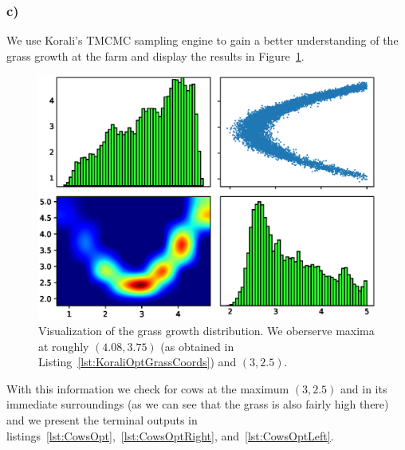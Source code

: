 \documentclass{article}
\begin{document}
    \subsubsection*{c)}
    \label{subsubsec:Task1c}

    We use Korali's TMCMC sampling engine to gain a better understanding of
    the grass growth at the farm and display the results in
    Figure~\ref{fig:GrassHeight}.

    \begin{figure}[H]
         \begin{center}
            \includegraphics[width=.75\textwidth]{task1/results/task1c.eps}
        \end{center}
        \caption{Visualization of the grass growth distribution.
        We oberserve maxima at roughly $\left( 4.08, 3 .75 \right)$
        (as obtained in Listing~\ref{lst:KoraliOptGrassCoords}) and
        $\left( 3, 2.5 \right)$.}
        \label{fig:GrassHeight}
    \end{figure}

    With this information we check for cows at the maximum
    $\left( 3, 2.5 \right)$ and in its immediate surroundings (as we can see
    that the grass is also fairly high there) and we present the terminal
    outputs in listings~\ref{lst:CowsOpt},~\ref{lst:CowsOptRight},
    and~\ref{lst:CowsOptLeft}.
\end{document}
